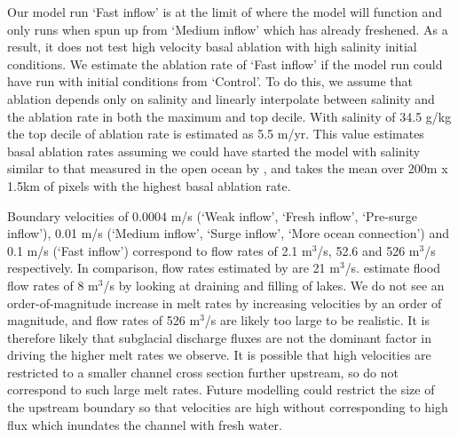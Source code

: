 Our model run `Fast inflow' is at the limit of where the model will function and only runs when spun up from `Medium inflow' which has already freshened. As a result, it does not test high velocity basal ablation with high salinity initial conditions. We estimate the ablation rate of `Fast inflow' if the model run could have run with initial conditions from `Control'. To do this, we assume that ablation depends only on salinity and linearly interpolate between salinity and the ablation rate in both the maximum and top decile. With salinity of 34.5 g/kg the top decile of ablation rate is estimated as 5.5 m/yr. This value estimates basal ablation rates assuming we could have started the model with salinity similar to that measured in the open ocean by \cite{robinson2020ice}, and takes the mean over 200m x 1.5km of pixels with the highest basal ablation rate. 


Boundary velocities of 0.0004  $\mathrm{m}$/s (`Weak inflow', `Fresh inflow', `Pre-surge inflow'), 0.01  $\mathrm{m}$/s (`Medium inflow', `Surge inflow', `More ocean connection') and 0.1 $\mathrm{m}$/s (`Fast inflow') correspond to flow rates of 2.1 $\mathrm{m}^3$/s, 52.6 and 526 $\mathrm{m}^3$/s respectively. In comparison, flow rates estimated by \cite{le2009subglacial} are 21 $\mathrm{m}^3$/s. \cite{kim2016active} estimate flood flow rates of 8 $\mathrm{m}^3$/s by looking at draining and filling of lakes. We do not see an order-of-magnitude increase in melt rates by increasing velocities by an order of magnitude, and flow rates of 526 $\mathrm{m}^3$/s are likely too large to be realistic. It is therefore likely that subglacial discharge fluxes are not the dominant factor in driving the higher melt rates we observe. It is possible that high velocities are restricted to a smaller channel cross section further upstream, so do not correspond to such large melt rates. Future modelling could restrict the size of the upstream boundary so that velocities are high without corresponding to high flux which inundates the channel with fresh water.

